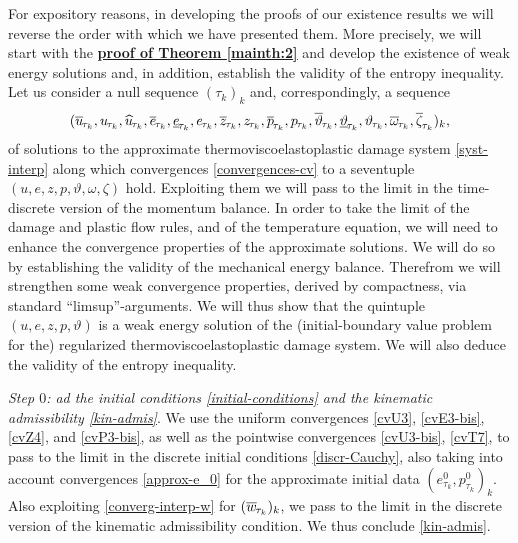 \documentclass[a4paper,10pt,reqno]{amsart}
\numberwithin{equation}{section}
\numberwithin{equation}{section}
\newcommand{\down}{\downarrow}
\newcommand{\teta}{\vartheta}
\newcommand{\piecewiseConstant}[2]{\overline{#1}_{\kern-1pt#2}}
\newcommand{\pwc}{\piecewiseConstant}
\newcommand{\upiecewiseConstant}[2]{\underline{#1}_{\kern-1pt#2}}
\newcommand{\upwc}{\upiecewiseConstant}
\newcommand{\piecewiseLinear}[2]{{#1}_{\kern-1pt#2}}
\newcommand{\pwl}{\piecewiseLinear}
\newcommand{\pwwll}[2]{\widehat{#1}_{\kern-1pt#2}}
\begin{document}
\par 
For expository reasons, 
in developing the proofs of our existence results
 we will
reverse the order with which we have presented them. More precisely, we will  start with  the
\textbf{\underline{proof of Theorem  \ref{mainth:2}}}
and develop the existence of weak energy solutions and, in addition, establish the validity of the entropy inequality. 
 Let us consider a null sequence $(\tau_k)_k$ and, correspondingly, a sequence
\[
(\pwc u{\tau_k}, \pwl u{\tau_k},   \pwwll  u{\tau_k},  \pwc e{\tau_k}, \upwc e{\tau_k},  \pwl e{\tau_k}, \pwc z{\tau_k}, \pwl z{\tau_k},  \pwc p{\tau_k}, \pwl p{\tau_k},
 \pwc\teta{\tau_k},  \upwc\teta{\tau_k}, \pwl{\teta}{\tau_k},  \pwc \omega{\tau_k}, \pwc \zeta{\tau_k})_k,
\]
of solutions to the approximate thermoviscoelastoplastic damage system  \eqref{syst-interp}
along which  convergences \eqref{convergences-cv} to a seventuple $(u,e,z,p,\teta, \omega,\zeta)$ hold.
 Exploiting them we will pass to the limit 
in the time-discrete version of the momentum balance. In order to take the limit  of the damage and  plastic flow rules, and of the temperature equation, we will need to enhance the convergence properties 
of the approximate solutions. We will do so by establishing the validity of the mechanical energy balance. Therefrom  we will strengthen some weak convergence properties, derived by compactness, via standard ``limsup''-arguments.
 We will thus show that the quintuple $(u,e,z,p,\teta)$ 
is a weak energy solution of the (initial-boundary value problem for the) regularized  thermoviscoelastoplastic damage system. We will also deduce the validity of the entropy inequality.
\par
\noindent
\emph{Step $0$: ad the initial conditions \eqref{initial-conditions} and the kinematic admissibility \eqref{kin-admis}}. 
We use the uniform  convergences \eqref{cvU3}, \eqref{cvE3-bis}, \eqref{cvZ4},  and \eqref{cvP3-bis}, as well as the pointwise convergences
 \eqref{cvU3-bis}, 
\eqref{cvT7},
 to pass to the limit in the discrete initial conditions \eqref{discr-Cauchy}, also taking into account convergences \eqref{approx-e_0}
  for the approximate initial data $(e_{\tau_k}^0, p_{\tau_k}^0)_k$.
  Also exploiting  \eqref{converg-interp-w}
  for $(\pwc w{\tau_k})_k$, we  pass to the limit in the discrete version of the kinematic admissibility condition. We thus conclude \eqref{kin-admis}. 
  \par
\end{document}

